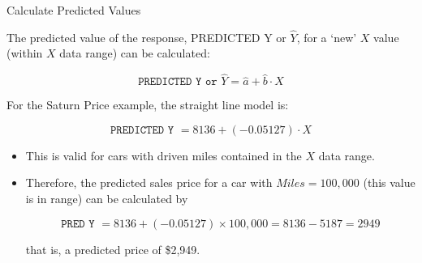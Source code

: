 \documentclass[14pt]{beamer}\usepackage[]{graphicx}\usepackage[]{color}
\begin{document}
\begin{frame}[fragile]{Calculate Predicted Values}

{\footnotesize{
The predicted value of the response, PREDICTED Y or $\hat{Y}$, for a `new' $X$ value (within $X$ data range) can be calculated:

{\footnotesize{
\begin{equation*}
\texttt{PREDICTED Y or } \hat{Y} = \hat{a} + \hat{b} \cdot X
\end{equation*}
}}

\vspace{-5mm}

For the Saturn Price example, the straight line model is:

{\footnotesize{
\begin{equation*}
\texttt{PREDICTED Y } = 8136 + (-0.05127) \cdot X
\end{equation*}
}}

\vspace{-6mm}

\begin{itemize}
\item This is valid for cars with driven miles contained in the $X$ data range.  \item Therefore, the predicted sales price for a car with $Miles = 100,000$ (this value is in range) can be calculated by

\vspace{-4mm}

{\footnotesize{
\begin{equation*}
\texttt{PRED Y } = 8136 + (-0.05127) \times 100,000 = 8136 - 5187 = 2949
\end{equation*}
}}

\vspace{-4mm}

that is, a predicted price of \$2,949.

\end{itemize}
}}
\end{frame}
\end{document}
